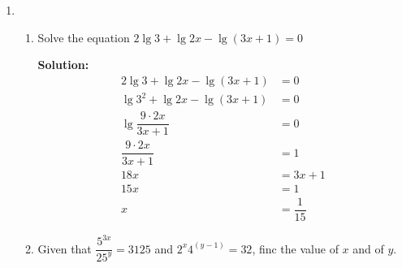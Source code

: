 \documentclass{report}
\newcommand{\sol}{\vspace{0.2cm}\textbf{Solution:}\vspace{0.2cm}}
\begin{document}
\begin{multicols*}{2}
\begin{enumerate}[leftmargin=*]
              \columnbreak
        \item \begin{enumerate}
                  \item Solve the equation $2 \lg 3+\lg 2 x-\lg (3 x+1)=0$

                        \sol{}
                        \begin{align*}
                            2 \lg 3 + \lg 2x - \lg (3x + 1) & = 0             \\
                            \lg 3^2 + \lg 2x - \lg (3x + 1) & = 0             \\
                            \lg \dfrac{9 \cdot 2x}{3x + 1}  & = 0             \\
                            \dfrac{9 \cdot 2x}{3x + 1}      & = 1             \\
                            18x                             & = 3x + 1        \\
                            15x                             & = 1             \\
                            x                               & = \dfrac{1}{15}
                        \end{align*}
                  \item Given that $\dfrac{5^{3 x}}{25^y}=3125$ and $2^x 4^{(y-1)}=32$, finc the value
                        of $x$ and of $y$.


\end{enumerate}
\end{enumerate}
\end{multicols*}
\end{document}
